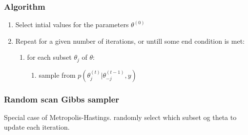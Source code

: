 \documentclass{article}
\begin{document}
                \subsubsection*{Algorithm}
                    \begin{enumerate}
                        \item Select intial values for the parameters $\theta^{(0)}$
                        \item Repeat for a given number of iterations, or untill some end condition is met:
                        \begin{enumerate}    
                            \item for each subset $\theta_j$ of $\theta$:
                            \begin{enumerate}
                                \item sample from $p\left(\theta_j^{(t)} | \theta_{-j}^{(t-1)}, y\right)$
                            \end{enumerate}
                        \end{enumerate}
                    \end{enumerate}

            \subsubsection{Random scan Gibbs sampler}
                Special case of Metropolis-Hastings.
                randomly select which subset og theta to update each iteration.
\end{document}

